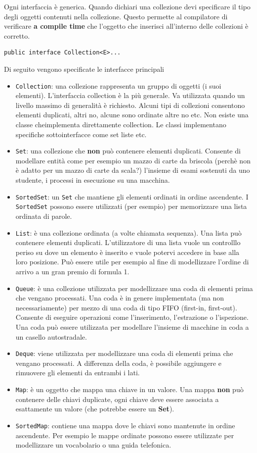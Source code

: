 \documentclass{article}
\begin{document}
Ogni interfaccia \`e generica. Quando dichiari una collezione devi specificare il tipo degli oggetti contenuti nella collezione. Questo permette al compilatore di verificare \textbf{a compile time} che l'oggetto che inserisci all'interno delle collezioni \`e corretto. 
\begin{lstlisting}
public interface Collection<E>...
\end{lstlisting}
Di seguito vengono specificate le interfacce principali
\begin{itemize}
\item \texttt{Collection}: una collezione rappresenta un gruppo di oggetti (i suoi elementi). L'interfaccia collection \`e la pi\`u generale. Va utilizzata quando un livello massimo di generalit\`a \`e richiesto. Alcuni tipi di collezioni consentono elementi duplicati, altri no, alcune sono ordinate altre no etc.  Non esiste una classe cheimplementa direttamente collection. Le classi implementano specifiche sottointerfacce come set liste etc. 
\item \texttt{Set}: una collezione che \textbf{non} pu\`o contenere elementi duplicati. Consente di modellare entit\`a come per esempio un mazzo di carte da briscola (perch\`e non \`e adatto per un mazzo di carte da scala?) l'insieme di esami sostenuti da uno studente, i processi in esecuzione su una macchina. 
\item \texttt{SortedSet}: un \texttt{Set} che mantiene gli elementi ordinati in ordine ascendente.  I \texttt{SortedSet} possono essere utilizzati (per esempio) per memorizzare una lista ordinata di parole.
\item \texttt{List}: \`e una collezione ordinata (a volte chiamata sequenza). Una lista pu\`o contenere elementi duplicati. L'utilizzatore di una lista vuole un controlllo periso su dove un elemento \`e inserito e vuole potervi accedere in base alla loro posizione. Pu\`o essere utile per esempio al fine di modellizzare l'ordine di arrivo a un gran premio di formula 1.
\item \texttt{Queue}: \`e una collezione utilizzata per modellizzare una coda di elementi  prima che vengano processati. Una coda \`e in genere implementata (ma non necessariamente) per mezzo di una coda di tipo FIFO (first-in, first-out). Consente di eseguire operazioni come l'inserimento, l'estrazione o l'ispezione. Una coda pu\`o essere utilizzata per modellare l'insieme di macchine in coda a un casello autostradale.
\item \texttt{Deque}: viene utilizzata per modellizzare una coda di elementi prima che vengano processati. A differenza della coda, \`e possibile aggiungere e rimuovere gli elementi da entrambi i lati.
\item \texttt{Map}: \`e un oggetto che mappa una chiave in un valore. Una mappa \textbf{non} pu\`o contenere delle chiavi duplicate, ogni chiave deve essere associata a esattamente un valore (che potrebbe essere un \textbf{Set}). 
\item \texttt{SortedMap}: contiene una mappa dove le chiavi sono mantenute in ordine ascendente. Per esempio le mappe ordinate possono essere utilizzate per modellizzare un vocabolario o una guida telefonica.
\end{itemize}
\end{document}
